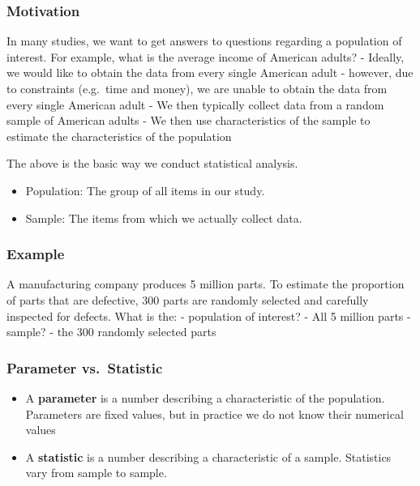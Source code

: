 \documentclass[
  openany]{book}
\providecommand{\tightlist}{%
  \setlength{\itemsep}{0pt}\setlength{\parskip}{0pt}}
\begin{document}
\subsubsection{Motivation}\label{motivation}

In many studies, we want to get answers to questions regarding a population of interest. For example, what is the average income of American adults? - Ideally, we would like to obtain the data from every single American adult - however, due to constraints (e.g.~time and money), we are unable to obtain the data from every single American adult - We then typically collect data from a random sample of American adults - We then use characteristics of the sample to estimate the characteristics of the population

The above is the basic way we conduct statistical analysis.

\begin{itemize}
\tightlist
\item
  Population: The group of all items in our study.
\item
  Sample: The items from which we actually collect data.
\end{itemize}

\subsubsection{Example}\label{example}

A manufacturing company produces 5 million parts. To estimate the proportion of parts that are defective, 300 parts are randomly selected and carefully inspected for defects. What is the: - population of interest? - All 5 million parts - sample? - the 300 randomly selected parts

\subsubsection{Parameter vs.~Statistic}\label{parameter-vs.-statistic}

\begin{itemize}
\tightlist
\item
  A \textbf{parameter} is a number describing a characteristic of the population. Parameters are fixed values, but in practice we do not know their numerical values
\item
  A \textbf{statistic} is a number describing a characteristic of a sample. Statistics vary from sample to sample.
\end{itemize}
\end{document}

